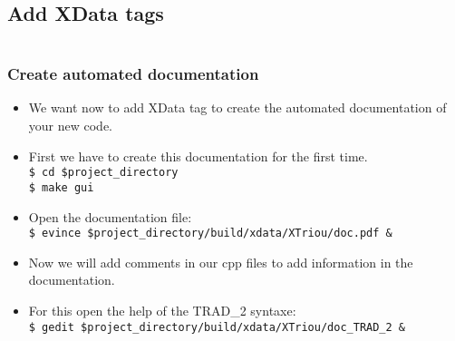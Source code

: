 \documentclass[10pt, hyperref={unicode=true,pdfusetitle, bookmarks=true,bookmarksnumbered=false,bookmarksopen=false, breaklinks=false,pdfborder={0 0 1},backref=true,colorlinks=true,linkcolor=darkblue,pageanchor, urlcolor=darkblue}]{beamer}
\begin{document}
\subsection{{\bf{Add XData tags}}}
\begin{frame}
\begin{columns}[c] 
\tableofcontents[sections={1-4},currentsection, currentsubsection]
\tableofcontents[sections={5-10},currentsection, currentsubsection]
\end{columns}
\end{frame}
\begin{frame}
\frametitle{Create automated documentation}
\begin{block}{}

\begin{itemize}
\item We want now to add XData tag to create the automated documentation of your new code.
\item First we have to create this documentation for the first time.\\
\texttt{\$ cd \$project\_directory}\\
\texttt{\$ make gui}
\item Open the documentation file:\\
\texttt{\$ evince \$project\_directory/build/xdata/XTriou/doc.pdf \&}
\item Now we will add comments in our cpp files to add information in the documentation.
\item For this open the help of the TRAD\_2 syntaxe:\\
\texttt{\$ gedit \$project\_directory/build/xdata/XTriou/doc\_TRAD\_2 \&}
\end{itemize}

\end{block}
\end{frame}
\end{document}
